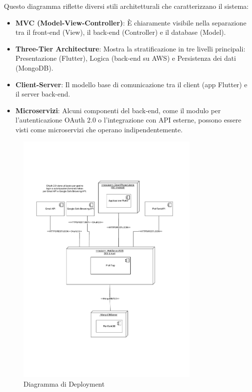 \noindent
Questo diagramma riflette diversi stili architetturali che caratterizzano il sistema:
\begin{itemize}
    \item \textbf{MVC (Model-View-Controller)}: È chiaramente visibile nella separazione tra il front-end (View), il back-end (Controller) e il database (Model).
    \item \textbf{Three-Tier Architecture}: Mostra la stratificazione in tre livelli principali: Presentazione (Flutter), Logica (back-end su AWS) e Persistenza dei dati (MongoDB).
    \item \textbf{Client-Server}: Il modello base di comunicazione tra il client (app Flutter) e il server back-end.
    \item \textbf{Microservizi}: Alcuni componenti del back-end, come il modulo per l'autenticazione OAuth 2.0 o l'integrazione con API esterne, possono essere visti come microservizi che operano indipendentemente.
\end{itemize}

\begin{figure}[h!]
\centering
\includegraphics[width=0.8\textwidth]{diagrammiUML/Deployment.pdf}
\caption{Diagramma di Deployment}
\label{fig:deployment}
\end{figure}

